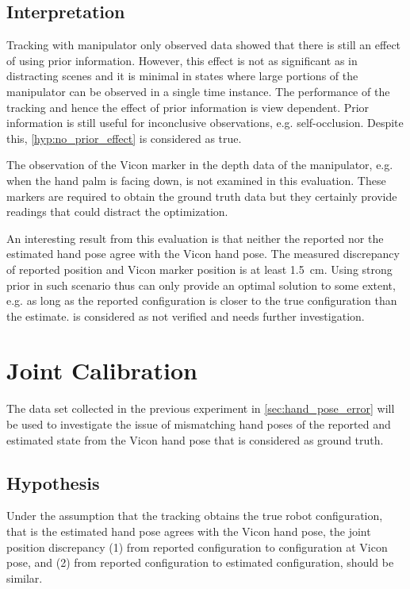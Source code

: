 \subsection{Interpretation}

Tracking with manipulator only observed data showed that there is still an effect of using prior information. However, this effect is not as significant as in distracting scenes and it is minimal in states where large portions of the manipulator can be observed in a single time instance. The performance of the tracking and hence the effect of prior information is view dependent. Prior information is still useful for inconclusive observations, e.g. self-occlusion. Despite this, \cref{hyp:no_prior_effect} is considered as true.

The observation of the Vicon marker in the depth data of the manipulator, e.g. when the hand palm is facing down, is not examined in this evaluation. These markers are required to obtain the ground truth data but they certainly provide  readings that could distract the optimization.

An interesting result from this evaluation is that neither the reported nor the estimated hand pose agree with the Vicon hand pose. The measured discrepancy of reported position and Vicon marker position is at least \SI{1.5}{\cm}. Using strong prior in such scenario thus can only provide an optimal solution to some extent, e.g. as long as the reported configuration is closer to the true configuration than the estimate.  is considered as not verified and needs further investigation.


\section{Joint Calibration}

The data set collected in the previous experiment in \cref{sec:hand_pose_error} will be used to investigate the issue of mismatching hand poses of the reported and estimated state from the Vicon hand pose that is considered as ground truth.

\subsection{Hypothesis}

Under the assumption that the tracking obtains the true robot configuration, that is the estimated hand pose agrees with the Vicon hand pose, the joint position discrepancy (1) from reported configuration to configuration at Vicon pose, and (2) from reported configuration to estimated configuration, should be similar.

